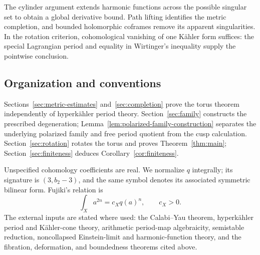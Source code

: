 The cylinder argument extends harmonic functions across the possible
singular set to obtain a global derivative bound. Path lifting identifies
the metric completion, and bounded holomorphic coframes remove its
apparent singularities. In the rotation criterion, cohomological
vanishing of one K\"ahler form suffices: the special Lagrangian period
and equality in Wirtinger's inequality supply the pointwise conclusion.

\subsection{Organization and conventions}

Sections~\ref{sec:metric-estimates} and~\ref{sec:completion} prove
the torus theorem independently of hyperk\"ahler period theory.
Section~\ref{sec:family} constructs the prescribed degeneration;
Lemma~\ref{lem:polarized-family-construction} separates the underlying
polarized family and free period quotient from the cusp calculation.
Section~\ref{sec:rotation} rotates the torus and proves
Theorem~\ref{thm:main}; Section~\ref{sec:finiteness} deduces
Corollary~\ref{cor:finiteness}.

Unspecified cohomology coefficients are real. We normalize $q$
integrally; its signature is $(3,b_2-3)$, and the same symbol
denotes its associated symmetric bilinear form. Fujiki's relation is
\begin{equation}\label{eq:fujiki}
        \int_X a^{2n}=c_Xq(a)^n,\qquad c_X>0.
\end{equation}
The external inputs are stated where used: the Calabi--Yau theorem,
hyperk\"ahler period and K\"ahler-cone theory, arithmetic period-map
algebraicity, semistable reduction, noncollapsed Einstein-limit
and harmonic-function theory, and the fibration, deformation, and
boundedness theorems cited above.
